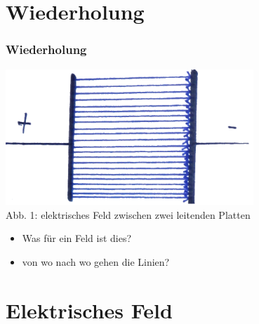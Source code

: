

\subtitle{Technik A08: \\
           Das elektromagnetische Feld \\[2em]}
\date{Stand 25.5.2015}


\section*{Wiederholung}

\begin{frame}
    \frametitle{Wiederholung}
    \begin{center}
		\includegraphics[width=0.7\textwidth]{a08/efeld1.png}\\
		\tiny Abb. 1: elektrisches Feld zwischen zwei leitenden Platten \large
		\begin{itemize}
			\item Was für ein Feld ist dies?
			\item von wo nach wo gehen die Linien?
		\end{itemize}
	\end{center}
\end{frame}

\section*{Elektrisches Feld}

